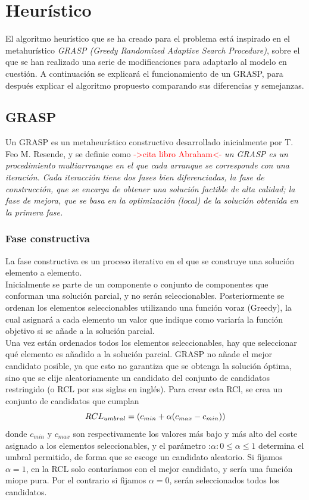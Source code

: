 \chapter{Heurístico}
\label{heurístico}
El algoritmo heurístico que se ha creado para el problema está inspirado en el metahurístico \textit{GRASP (Greedy Randomized Adaptive Search Procedure)}, sobre el que se han realizado una serie de modificaciones para adaptarlo al modelo en cuestión. A continuación se explicará el funcionamiento de un GRASP, para después explicar el algoritmo propuesto comparando sus diferencias y semejanzas.

\section{GRASP}
Un GRASP es un metaheurístico constructivo desarrollado inicialmente por T. Feo   M. Resende, y se definie como \textcolor{red}{->cita libro Abraham<-} \textit{un GRASP es un procedimiento multiarrranque en el que cada arranque se corresponde con una iteración. Cada iteracción tiene dos fases bien diferenciadas, la fase de construcción, que se encarga de obtener una solución factible de alta calidad; la fase de mejora, que se basa en la optimización (local) de la solución obtenida en la primera fase.}

\subsection{Fase constructiva}
La fase constructiva es un proceso iterativo en el que se construye una solución elemento a elemento.\\
Inicialmente se parte de un componente o conjunto de componentes que conforman una solución parcial, y no serán seleccionables. Posteriormente se ordenan los elementos seleccionables utilizando una función voraz (Greedy), la cual asignará a cada elemento un valor que indique como variaría la función objetivo si se añade a la solución parcial.\\
Una vez están ordenados todos los elementos seleccionables, hay que seleccionar qué elemento es añadido a la solución parcial. GRASP no añade el mejor candidato posible, ya que esto no garantiza que se obtenga la solución óptima, sino que se elije aleatoriamente un candidato del conjunto de candidatos restringido (o RCL por sus siglas en inglés). Para crear esta RCl, se crea un conjunto de candidatos que cumplan
\begin{equation}\\
{RCL}_{umbral} = (c_{min}+\alpha(c_{max} - c_{min} ))
\end{equation}
donde $c_{min}$ y $c_{max}$ son respectivamente los valores más bajo y más alto del coste asignado a los elementos seleccionables, y el parámetro  :$\alpha : 0\leq \alpha \leq1$ determina el umbral permitido, de forma que se escoge un candidato aleatorio. Si fijamos $\alpha=1$, en la RCL solo contaríamos con el mejor candidato, y sería una función miope pura. Por el contrario si fijamos $\alpha=0$, serán seleccionados todos los candidatos.\\

